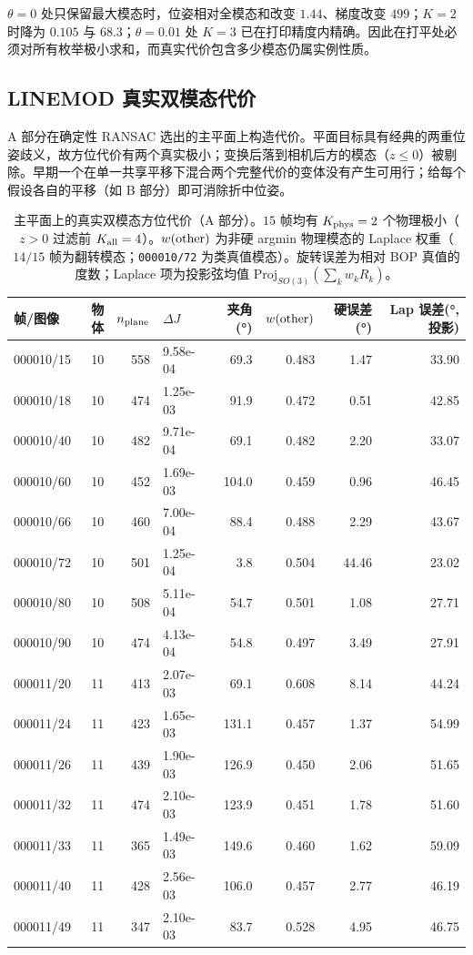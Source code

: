 $\theta=0$ 处只保留最大模态时，位姿相对全模态和改变 $1.44$、梯度改变 $499$；$K=2$ 时降为 $0.105$ 与 $68.3$；$\theta=0.01$ 处 $K=3$ 已在打印精度内精确。因此在打平处必须对所有枚举极小求和，而真实代价包含多少模态仍属实例性质。

\subsection{LINEMOD 真实双模态代价}\label{sec:real}

A 部分在确定性 RANSAC 选出的主平面上构造代价。平面目标具有经典的两重位姿歧义，故方位代价有两个真实极小；变换后落到相机后方的模态（$z\le0$）被剔除。早期一个在单一共享平移下混合两个完整代价的变体没有产生可用行；给每个假设各自的平移（如 B 部分）即可消除折中位姿。

\begin{table}[t]
\centering
\caption{主平面上的真实双模态方位代价（A 部分）。$15$ 帧均有 $K_{\rm phys}=2$ 个物理极小（$z>0$ 过滤前 $K_{\rm all}=4$）。$w({\rm other})$ 为非硬 argmin 物理模态的 Laplace 权重（$14/15$ 帧为翻转模态；\texttt{000010/72} 为类真值模态）。旋转误差为相对 BOP 真值的度数；Laplace 项为投影弦均值 $\mathrm{Proj}_{SO(3)}(\sum_kw_kR_k)$。}
\label{tab:twomode}
\scriptsize
\setlength{\tabcolsep}{2pt}
\begin{tabular}{@{}l r r l r r r r@{}}
\toprule
帧/图像 & 物体 & $n_{\rm plane}$ & $\Delta J$ & 夹角(°) & $w({\rm other})$ & 硬误差(°) & Lap 误差(°, 投影)\\
\midrule
000010/15 & 10 & 558 & 9.58e-04 & 69.3 & 0.483 & 1.47 & 33.90\\
000010/18 & 10 & 474 & 1.25e-03 & 91.9 & 0.472 & 0.51 & 42.85\\
000010/40 & 10 & 482 & 9.71e-04 & 69.1 & 0.482 & 2.20 & 33.07\\
000010/60 & 10 & 452 & 1.69e-03 & 104.0 & 0.459 & 0.96 & 46.45\\
000010/66 & 10 & 460 & 7.00e-04 & 88.4 & 0.488 & 2.29 & 43.67\\
000010/72 & 10 & 501 & 1.25e-04 & 3.8 & 0.504 & 44.46 & 23.02\\
000010/80 & 10 & 508 & 5.11e-04 & 54.7 & 0.501 & 1.08 & 27.71\\
000010/90 & 10 & 474 & 4.13e-04 & 54.8 & 0.497 & 3.49 & 27.91\\
000011/20 & 11 & 413 & 2.07e-03 & 69.1 & 0.608 & 8.14 & 44.24\\
000011/24 & 11 & 423 & 1.65e-03 & 131.1 & 0.457 & 1.37 & 54.99\\
000011/26 & 11 & 439 & 1.90e-03 & 126.9 & 0.450 & 2.06 & 51.65\\
000011/32 & 11 & 474 & 2.10e-03 & 123.9 & 0.451 & 1.78 & 51.60\\
000011/33 & 11 & 365 & 1.49e-03 & 149.6 & 0.460 & 1.62 & 59.09\\
000011/40 & 11 & 428 & 2.56e-03 & 106.0 & 0.457 & 2.77 & 46.19\\
000011/49 & 11 & 347 & 2.10e-03 & 83.7 & 0.528 & 4.95 & 46.75\\
\bottomrule
\end{tabular}
\end{table}


